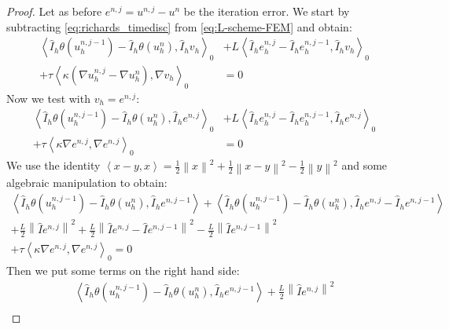 \documentclass[../Main/main.tex]{subfiles}
\begin{document}
	\begin{proof}
		Let as before $e^{n,j} = u^{n,j}-u^n$ be the iteration error.
		We start by subtracting \eqref{eq:richards_timedisc} from \eqref{eq:L-scheme-FEM} and obtain:
			\begin{equation}
			\begin{aligned}
				\left \langle \hat{I}_h \theta(u^{n,j-1}_h) - \hat{I}_h \theta(u^{n}_h),\hat{I}_h v_h \right \rangle_0 &+ L \left \langle \hat{I}_h e^{n,j}_h -  \hat{I}_h e^{n,j-1}_h,\hat{I}_h v_h \right \rangle_0 \\+ \tau \left \langle \kappa (\nabla u^{n,j}_h-\nabla u^{n}_h),\nabla v_h \right \rangle_0 &=0 
			\end{aligned}
		\end{equation}
		Now we test with $v_h=e^{n,j}$:
		\begin{equation}
			\begin{aligned}
				\left \langle \hat{I}_h \theta(u^{n,j-1}_h) - \hat{I}_h \theta(u^{n}_h),\hat{I}_h e^{n,j} \right \rangle_0 &+ L \left \langle \hat{I}_h e^{n,j}_h -  \hat{I}_h e^{n,j-1}_h,\hat{I}_h e^{n,j} \right \rangle_0 \\+ \tau \left \langle \kappa\nabla e^{n,j},\nabla e^{n,j} \right \rangle_0 &=0 
			\end{aligned}
		\end{equation}
		We use the identity $\left \langle x-y,x\right \rangle = \frac{1}{2}\left \| x \right \|^2 + \frac{1}{2}\left \| x-y \right \|^2 - \frac{1}{2} \left \| y \right \|^2$ and some algebraic manipulation to obtain:
		\begin{equation}
			\begin{gathered}
					\left \langle \hat{I}_h \theta(u^{n,j-1}_h) - \hat{I}_h \theta(u^{n}_h),\hat{I}_h e^{n,j-1} \right \rangle + 	\left \langle \hat{I}_h \theta(u^{n,j-1}_h) - \hat{I}_h \theta(u^{n}_h),\hat{I}_h e^{n,j} - \hat{I}_h e^{n,j-1}\right \rangle \\
					+\frac{L}{2}\left \| \hat{I} e^{n,j}\right \|^2 + \frac{L}{2}\left \| \hat{I} e^{n,j}-\hat{I}e^{n,j-1} \right \|^2 -\frac{L}{2}\left \| \hat{I} e^{n,j-1}\right \|^2 \\
				+ \tau \left \langle \kappa \nabla e^{n,j},\nabla e^{n,j} \right \rangle_0 =0 
			\end{gathered}
		\end{equation}
		Then we put some terms on the right hand side:
		\begin{equation}
			\begin{gathered}
				\left \langle \hat{I}_h \theta(u^{n,j-1}_h) - \hat{I}_h \theta(u^{n}_h),\hat{I}_h e^{n,j-1} \right \rangle +\frac{L}{2}\left \| \hat{I} e^{n,j}\right \|^2 	 \\

\end{gathered}
\end{equation}
\end{proof}
\end{document}
